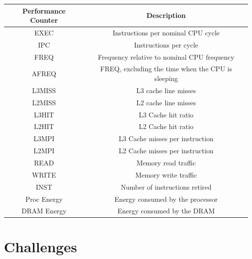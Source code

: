 \documentclass[a0,portrait]{a0poster}
\renewcommand{\small}{\fontsize{24.88}{30}\selectfont}
\newcommand{\PAD}{\vskip 0.75cm}
\begin{document}
\begin{multicols}{2}
{
\PAD
  \centering
  \label{tbl:pcm}
  \small
  \begin{tabular}{c|c}
    \textbf{Performance Counter} & \textbf{Description} \\
    \hline
    EXEC & Instructions per nominal CPU cycle \\
    IPC & Instructions per cycle \\
    FREQ & Frequency relative to nominal CPU frequency \\
    AFREQ & FREQ, excluding the time when the CPU is sleeping \\
    L3MISS & L3 cache line misses \\
    L2MISS & L2 cache line misses \\
    L3HIT & L3 Cache hit ratio \\
    L2HIT & L2 Cache hit ratio \\
    L3MPI & L3 Cache misses per instruction \\
    L2MPI & L2 Cache misses per instruction \\
    READ & Memory read traffic \\
    WRITE & Memory write traffic \\
    INST & Number of instructions retired \\
    Proc Energy & Energy consumed by the processor \\
    DRAM Energy & Energy consumed by the DRAM \\
  \end{tabular}
\PAD
}


\section*{Challenges}


\end{multicols}
\end{document}
